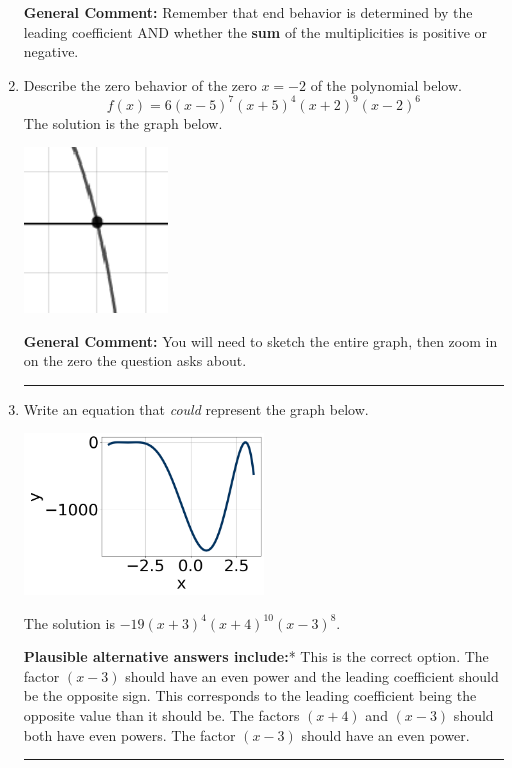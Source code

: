 \documentclass{extbook}[14pt]
\newcommand{\litem}[1]{\item #1

\rule{\textwidth}{0.4pt}}
\begin{document}
\begin{enumerate}
{\textbf{General Comment:} Remember that end behavior is determined by the leading coefficient AND whether the \textbf{sum} of the multiplicities is positive or negative.
}
\litem{
Describe the zero behavior of the zero $x = -2$ of the polynomial below.
\[ f(x) = 6(x - 5)^{7}(x + 5)^{4}(x + 2)^{9}(x - 2)^{6} \]The solution is the graph below.
    \begin{center}
        \includegraphics[width=0.3\textwidth]{../Figures/polyZeroBehaviorAB.png}
    \end{center}

\textbf{General Comment:} You will need to sketch the entire graph, then zoom in on the zero the question asks about.
}
\litem{
Write an equation that \textit{could} represent the graph below.

\begin{center}
    \includegraphics[width=0.5\textwidth]{../Figures/polyGraphToFunctionB.png}
\end{center}


The solution is \( -19(x + 3)^{4} (x + 4)^{10} (x - 3)^{8} \).\begin{enumerate}[label=\Alph*.]
\textbf{Plausible alternative answers include:}* This is the correct option.
The factor $(x - 3)$ should have an even power and the leading coefficient should be the opposite sign.
This corresponds to the leading coefficient being the opposite value than it should be.
The factors $(x + 4)$ and $(x - 3)$ should both have even powers.
The factor $(x - 3)$ should have an even power.
\end{enumerate}

}
\end{enumerate}
\end{document}
